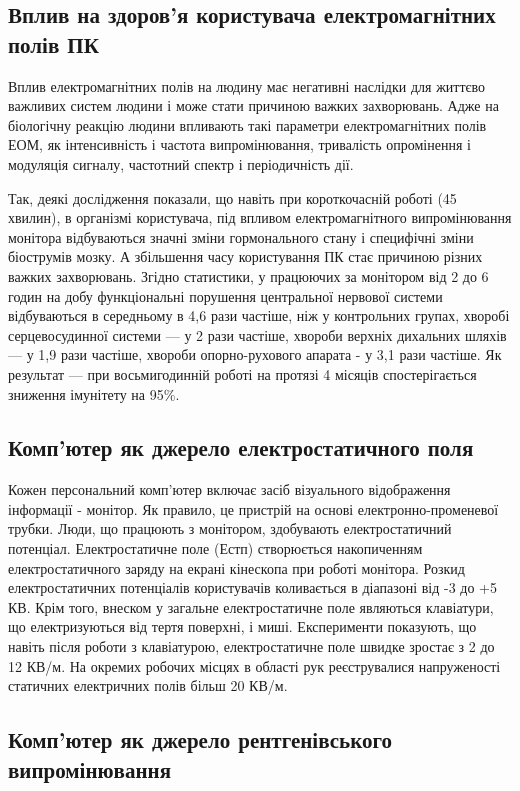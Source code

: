 \subsection{Вплив на здоров'я користувача електромагнітних полів ПК}

Вплив електромагнітних полів на людину має негативні наслідки для життєво важливих систем людини і може стати причиною важких захворювань. Адже на біологічну реакцію людини впливають такі параметри електромагнітних полів ЕОМ, як інтенсивність і частота випромінювання, тривалість опромінення і модуляція сигналу, частотний спектр і періодичність дії.

Так, деякі дослідження показали, що навіть при короткочасній роботі (45 хвилин), в організмі користувача, під впливом електромагнітного випромінювання монітора відбуваються значні зміни гормонального стану і специфічні зміни біострумів мозку. А збільшення часу користування ПК стає причиною різних важких захворювань. Згідно статистики, у працюючих за монітором від 2 до 6 годин на добу функціональні порушення центральної нервової системи відбуваються в середньому в 4,6 рази частіше, ніж у контрольних групах, хворобі серцевосудинної системи --- у 2 рази частіше, хвороби верхніх дихальних шляхів --- у 1,9 рази частіше, хвороби опорно-рухового апарата - у 3,1 рази частіше. Як результат --- при восьмигодинній роботі на протязі 4 місяців спостерігається зниження імунітету на 95\%.


\subsection{Комп'ютер як джерело електростатичного поля}

Кожен персональний комп'ютер включає засіб візуального відображення інформації - монітор. Як правило, це пристрій на основі електронно-променевої трубки. Люди, що працюють з монітором, здобувають електростатичний потенціал. Електростатичне поле (Естп) створюється накопиченням електростатичного заряду на екрані кінескопа при роботі монітора. Розкид електростатичних потенціалів користувачів коливається в діапазоні від -3 до +5 КВ.
Крім того, внеском у загальне електростатичне поле являються клавіатури, що електризуються від тертя поверхні, і миші. Експерименти показують, що навіть після роботи з клавіатурою, електростатичне поле швидке зростає з 2 до 12 КВ/м. На окремих робочих місцях в області рук реєструвалися напруженості статичних електричних полів більш 20 КВ/м.

\subsection{Комп'ютер як джерело рентгенівського випромінювання}

